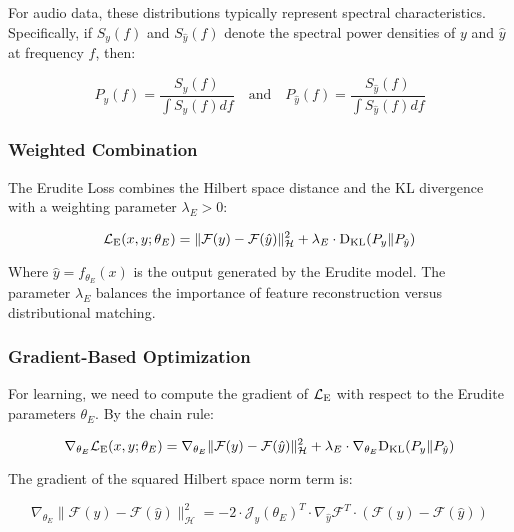 For audio data, these distributions typically represent spectral characteristics. Specifically, if $S_y(f)$ and $S_{\hat{y}}(f)$ denote the spectral power densities of $y$ and $\hat{y}$ at frequency $f$, then:

\begin{equation}
P_y(f) = \frac{S_y(f)}{\int S_y(f) df} \quad \text{and} \quad P_{\hat{y}}(f) = \frac{S_{\hat{y}}(f)}{\int S_{\hat{y}}(f) df}
\end{equation}

\subsubsection{Weighted Combination}

The Erudite Loss combines the Hilbert space distance and the KL divergence with a weighting parameter $\lambda_E > 0$:

\begin{equation}
\mathcal{L}_{\text{E}}(x, y; \theta_E) = \|\mathcal{F}(y) - \mathcal{F}(\hat{y})\|_{\mathcal{H}}^2 + \lambda_E \cdot \mathrm{D_{KL}}(P_y \| P_{\hat{y}})
\end{equation}

Where $\hat{y} = f_{\theta_E}(x)$ is the output generated by the Erudite model. The parameter $\lambda_E$ balances the importance of feature reconstruction versus distributional matching.

\subsubsection{Gradient-Based Optimization}

For learning, we need to compute the gradient of $\mathcal{L}_{\text{E}}$ with respect to the Erudite parameters $\theta_E$. By the chain rule:

\begin{equation}
\nabla_{\theta_E} \mathcal{L}_{\text{E}}(x, y; \theta_E) = \nabla_{\theta_E} \|\mathcal{F}(y) - \mathcal{F}(\hat{y})\|_{\mathcal{H}}^2 + \lambda_E \cdot \nabla_{\theta_E} \mathrm{D_{KL}}(P_y \| P_{\hat{y}})
\end{equation}

The gradient of the squared Hilbert space norm term is:

\begin{equation}
\nabla_{\theta_E} \|\mathcal{F}(y) - \mathcal{F}(\hat{y})\|_{\mathcal{H}}^2 = -2 \cdot \mathcal{J}_{\hat{y}}(\theta_E)^T \cdot \nabla_{\hat{y}} \mathcal{F}^T \cdot (\mathcal{F}(y) - \mathcal{F}(\hat{y}))
\end{equation}


